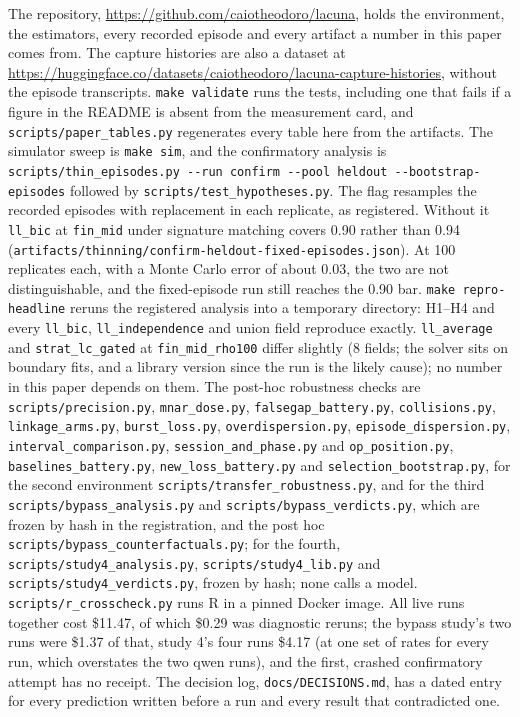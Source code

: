 \documentclass[11pt]{article}
\begin{document}
The repository, \url{https://github.com/caiotheodoro/lacuna}, holds the
environment, the estimators, every recorded episode and every artifact a number
in this paper comes from. The capture histories are also a dataset at
\url{https://huggingface.co/datasets/caiotheodoro/lacuna-capture-histories},
without the episode transcripts. \texttt{make validate} runs the
tests, including one that fails if a figure in the README is absent from the
measurement card, and \texttt{scripts/paper\_tables.py} regenerates every table here
from the artifacts. The simulator sweep is \texttt{make sim}, and the confirmatory
analysis is \texttt{scripts/thin\_episodes.py -{}-run confirm -{}-pool heldout
-{}-bootstrap-episodes} followed by \texttt{scripts/test\_hypotheses.py}. The flag
resamples the recorded episodes with replacement in each replicate, as registered.
Without it \texttt{ll\_bic} at \texttt{fin\_mid} under signature matching covers
0.90 rather than 0.94 (\texttt{artifacts/thinning/confirm-heldout-fixed-episodes.json}).
At 100 replicates each, with a Monte Carlo error of about 0.03, the two are not
distinguishable, and the fixed-episode run still reaches the 0.90 bar.
\texttt{make repro-headline} reruns the registered analysis into a temporary
directory: H1--H4 and every \texttt{ll\_bic}, \texttt{ll\_independence} and union
field reproduce exactly. \texttt{ll\_average} and \texttt{strat\_lc\_gated} at
\texttt{fin\_mid\_rho100} differ slightly (8 fields; the solver sits on boundary fits,
and a library version since the run is the likely cause); no number in this paper
depends on them. The post-hoc robustness checks are
\texttt{scripts/precision.py}, \texttt{mnar\_dose.py}, \texttt{falsegap\_battery.py},
\texttt{collisions.py}, \texttt{linkage\_arms.py}, \texttt{burst\_loss.py},
\texttt{overdispersion.py}, \texttt{episode\_dispersion.py},
\texttt{interval\_comparison.py}, \texttt{session\_and\_phase.py} and
\texttt{op\_position.py}, \texttt{baselines\_battery.py},
\texttt{new\_loss\_battery.py} and \texttt{selection\_bootstrap.py}, for the
second environment \texttt{scripts/transfer\_robustness.py}, and for the third
\texttt{scripts/bypass\_analysis.py} and \texttt{scripts/bypass\_verdicts.py}, which
are frozen by hash in the registration, and the post hoc
\texttt{scripts/bypass\_counterfactuals.py}; for the fourth,
\texttt{scripts/study4\_analysis.py}, \texttt{scripts/study4\_lib.py} and
\texttt{scripts/study4\_verdicts.py}, frozen by hash; none calls a model.
\texttt{scripts/r\_crosscheck.py} runs R in a pinned Docker image. All live runs together cost
\$11.47, of which \$0.29 was diagnostic reruns; the bypass study's two runs were
\$1.37 of that, study 4's four runs \$4.17 (at one set of rates for every run, which
overstates the two qwen runs), and the first, crashed confirmatory attempt has no receipt. The decision log, \texttt{docs/DECISIONS.md}, has a dated entry for every prediction
written before a run and every result that contradicted one.
\end{document}
